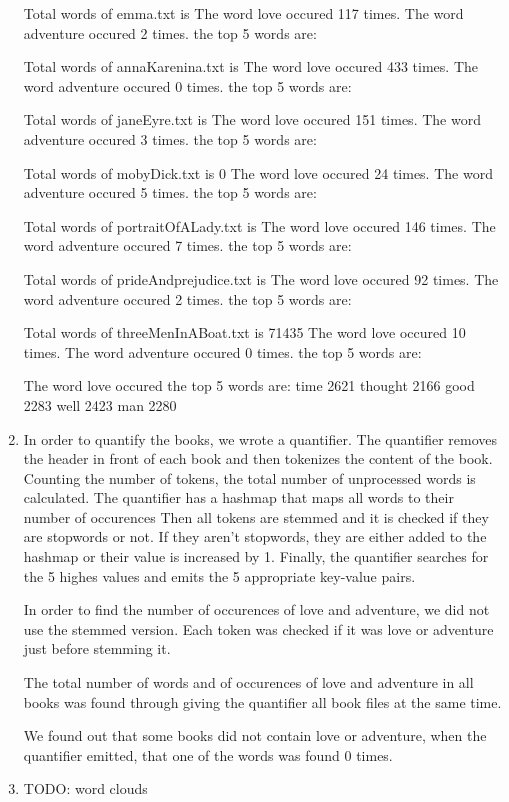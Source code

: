 \documentclass[a4paper,11pt,oneside]{book}
\begin{document}
\begin{enumerate}
					

Total words of emma.txt is 
The word love occured 117 times.
The word adventure occured 2 times.
the top 5 words are: 








Total words of annaKarenina.txt is 
The word love occured 433 times.
The word adventure occured 0 times.
the top 5 words are: 



Total words of janeEyre.txt is 
The word love occured 151 times.
The word adventure occured 3 times.
the top 5 words are: 


Total words of mobyDick.txt is 0
The word love occured 24 times.
The word adventure occured 5 times.
the top 5 words are: 


Total words of portraitOfALady.txt is  
The word love occured 146 times.
The word adventure occured 7 times.
the top 5 words are: 


Total words of prideAndprejudice.txt is 
The word love occured 92 times.
The word adventure occured 2 times.
the top 5 words are: 



Total words of threeMenInABoat.txt is 71435
The word love occured 10 times.
The word adventure occured 0 times.
the top 5 words are: 


The word love occured 
the top 5 words are: 
time	2621
thought	2166
good	2283
well	2423
man	2280
	\item In order to quantify the books, we wrote a quantifier. The quantifier removes the header in front of each book and then tokenizes the content of the book. Counting the number of tokens, the total number of unprocessed words is calculated.
The quantifier has a hashmap that maps all words to their number of occurences
Then all tokens are stemmed and it is checked if they are stopwords or not. If they aren't stopwords, they are either added to the hashmap or their value is increased by 1.
Finally, the quantifier searches for the 5 highes values and emits the 5 appropriate key-value pairs.

In order to find the number of occurences of love and adventure, we did not use the stemmed version. Each token was checked if it was love or adventure just before stemming it.

The total number of words and of occurences of love and adventure in all books was found through giving the quantifier all book files at the same time.

We found out that some books did not contain love or adventure, when the quantifier emitted, that one of the words was found 0 times.
	\item TODO: word clouds
\end{enumerate}
\end{document}
